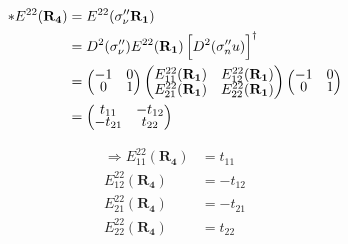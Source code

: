 \documentclass{article}
\begin{document}
\begin{align*}
	\ast E^{22}(\mathbf{R_4}) & = E^{22}(\sigma''_\nu\mathbf{ R_1})                                               \\
	                          & = D^2(\sigma''_\nu)  E^{22}(\mathbf{R_1}) \left[ D^2(\sigma''_nu) \right]^\dagger \\
	                          &
	=
	\begin{pmatrix}
		\renewcommand{\arraystretch}{0.72}
		-1 & 0 \\
		0  & 1
	\end{pmatrix}
	\begin{pmatrix}
		E_{11}^{22}(\mathbf{R_1}) & E_{12}^{22}(\mathbf{R_1}) \\
		E_{21}^{22}(\mathbf{R_1}) & E_{22}^{22}(\mathbf{R_1})
	\end{pmatrix}
	\begin{pmatrix}
		-1 & 0 \\
		0  & 1
	\end{pmatrix}                                                                                                \\
	                          & = \begin{pmatrix}
		                              t_{11}  & -t_{12} \\
		                              -t_{21} & t_{22}
	                              \end{pmatrix}
\end{align*}

\begin{align*}
	\Rightarrow E_{11}^{22}(\mathbf{R_4}) & = t_{11}  \\
	E_{12}^{22}(\mathbf{R_4})             & = -t_{12} \\
	E_{21}^{22}(\mathbf{R_4})             & = -t_{21} \\
	E_{22}^{22}(\mathbf{R_4})             & = t_{22}  \\
\end{align*}
\end{document}
